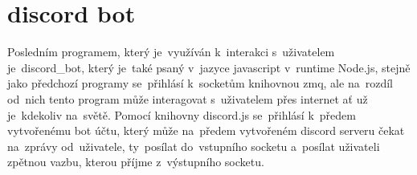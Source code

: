 
\section{discord bot}

Posledním programem, který je~využíván k~interakci s~uživatelem je~discord\_bot, který je~také psaný v~jazyce javascript v~runtime Node.js, stejně jako předchozí programy se~přihlásí k~socketům knihovnou zmq, ale na~rozdíl od~nich tento program může interagovat s~uživatelem přes internet ať už je~kdekoliv na~světě.
Pomocí knihovny discord.js se~přihlásí k~předem vytvořenému bot účtu, který může na~předem vytvořeném discord serveru čekat na~zprávy od~uživatele, ty~posílat do~vstupního socketu a~posílat uživateli zpětnou vazbu, kterou příjme z~výstupního socketu.

